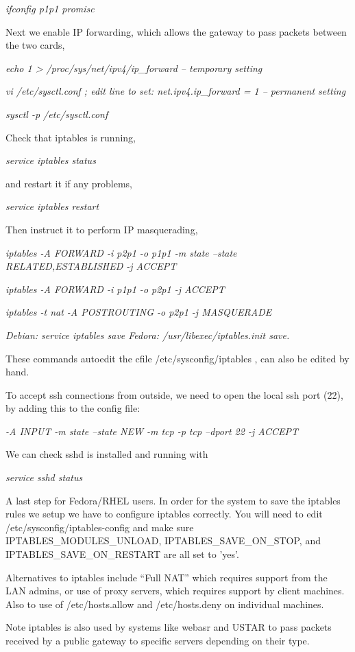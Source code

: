 \documentclass[oneside,english]{scrbook}
\begin{document}
\emph{ifconfig p1p1 promisc}

Next we enable IP forwarding, which allows the gateway to pass packets
between the two cards,

\emph{echo 1 > /proc/sys/net/ipv4/ip\_forward -- temporary setting}

\emph{vi /etc/sysctl.conf ; edit line to set: net.ipv4.ip\_forward
= 1 -- permanent setting}

\emph{sysctl -p /etc/sysctl.conf}

Check that iptables is running,

\emph{service iptables status}

and restart it if any problems,

\emph{service iptables restart}

Then instruct it to perform IP masquerading,

\emph{iptables -A FORWARD -i p2p1 -o p1p1 -m state --state RELATED,ESTABLISHED
-j ACCEPT }

\emph{iptables -A FORWARD -i p1p1 -o p2p1 -j ACCEPT }

\emph{iptables -t nat -A POSTROUTING -o p2p1 -j MASQUERADE}

\emph{Debian: service iptables save Fedora: /usr/libexec/iptables.init
save.}

These commands autoedit the cfile /etc/sysconfig/iptables , can also
be edited by hand.

To accept ssh connections from outside, we need to open the local
ssh port (22), by adding this to the config file:

\emph{-A INPUT -m state --state NEW -m tcp -p tcp --dport 22 -j ACCEPT}

We can check sshd is installed and running with

\emph{service sshd status }

A last step for Fedora/RHEL users. In order for the system to save
the iptables rules we setup we have to configure iptables correctly.
You will need to edit /etc/sysconfig/iptables-config and make sure
IPTABLES\_MODULES\_UNLOAD, IPTABLES\_SAVE\_ON\_STOP, and IPTABLES\_SAVE\_ON\_RESTART
are all set to 'yes'.

Alternatives to iptables include ``Full NAT'' which requires support
from the LAN admins, or use of proxy servers, which requires support
by client machines. Also to use of /etc/hosts.allow and /etc/hosts.deny
on individual machines.

Note iptables is also used by systems like webasr and USTAR to pass
packets received by a public gateway to specific servers depending
on their type.
\end{document}
